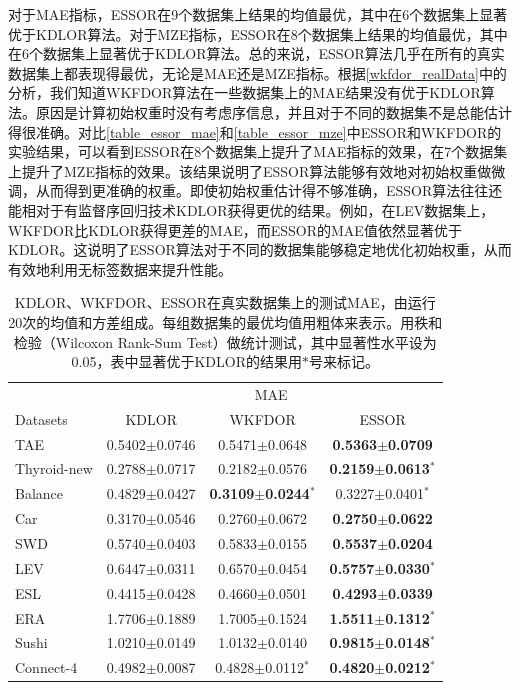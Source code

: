 对于MAE指标，ESSOR在9个数据集上结果的均值最优，其中在6个数据集上显著优于KDLOR算法。对于MZE指标，ESSOR在8个数据集上结果的均值最优，其中在6个数据集上显著优于KDLOR算法。总的来说，ESSOR算法几乎在所有的真实数据集上都表现得最优，无论是MAE还是MZE指标。根据\autoref{wkfdor_realData}中的分析，我们知道WKFDOR算法在一些数据集上的MAE结果没有优于KDLOR算法。原因是计算初始权重时没有考虑序信息，并且对于不同的数据集不是总能估计得很准确。对比\autoref{table_essor_mae}和\autoref{table_essor_mze}中ESSOR和WKFDOR的实验结果，可以看到ESSOR在8个数据集上提升了MAE指标的效果，在7个数据集上提升了MZE指标的效果。该结果说明了ESSOR算法能够有效地对初始权重做微调，从而得到更准确的权重。即使初始权重估计得不够准确，ESSOR算法往往还能相对于有监督序回归技术KDLOR获得更优的结果。例如，在LEV数据集上，WKFDOR比KDLOR获得更差的MAE，而ESSOR的MAE值依然显著优于KDLOR。这说明了ESSOR算法对于不同的数据集能够稳定地优化初始权重，从而有效地利用无标签数据来提升性能。


\begin{table}[!h]
\caption{KDLOR、WKFDOR、ESSOR在真实数据集上的测试MAE，由运行20次的均值和方差组成。每组数据集的最优均值用粗体来表示。用秩和检验（Wilcoxon Rank-Sum Test）做统计测试，其中显著性水平设为0.05，表中显著优于KDLOR的结果用$*$号来标记。}
\label{table_essor_mae}
\centering
\begin{tabular}{l|ccc}
\toprule
 & \multicolumn {3}{c}{MAE} \\
 \cmidrule {2-4}
Datasets & KDLOR & WKFDOR & ESSOR \\
\midrule
TAE &  0.5402$\pm$0.0746 &  0.5471$\pm$0.0648 & {\bf 0.5363$\pm$0.0709} \\
Thyroid-new & 0.2788$\pm$0.0717 &  0.2182$\pm$0.0576 & {\bf 0.2159$\pm$0.0613}$^{*}$ \\
Balance & 0.4829$\pm$0.0427 &  {\bf 0.3109$\pm$0.0244}$^{*}$ & 0.3227$\pm$0.0401$^{*}$ \\
Car & 0.3170$\pm$0.0546 &  0.2760$\pm$0.0672 & {\bf 0.2750$\pm$0.0622} \\
SWD & 0.5740$\pm$0.0403 &  0.5833$\pm$0.0155 & {\bf 0.5537$\pm$0.0204} \\
LEV & 0.6447$\pm$0.0311 &  0.6570$\pm$0.0454 & {\bf 0.5757$\pm$0.0330}$^{*}$ \\
ESL & 0.4415$\pm$0.0428 &  0.4660$\pm$0.0501 & {\bf 0.4293$\pm$0.0339} \\
ERA & 1.7706$\pm$0.1889 &  1.7005$\pm$0.1524 & {\bf 1.5511$\pm$0.1312}$^{*}$ \\
Sushi & 1.0210$\pm$0.0149 & 1.0132$\pm$0.0140 & {\bf 0.9815$\pm$0.0148}$^{*}$ \\
Connect-4 & 0.4982$\pm$0.0087 & 0.4828$\pm$0.0112$^{*}$ & {\bf 0.4820$\pm$0.0212}$^{*}$ \\
\bottomrule
\end{tabular}
\end{table}

